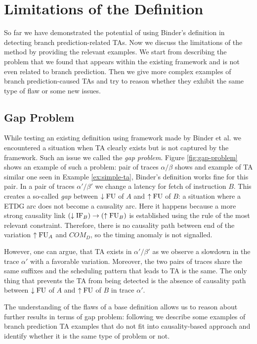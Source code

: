 \section{Limitations of the Definition}

So far we have demonstrated the potential of using Binder's definition in detecting branch prediction-related TAs. Now we discuss the limitations of the method by providing the relevant examples. We start from describing the problem that we found that appears within the existing framework and is not even related to branch prediction. Then we give more complex examples of branch prediction-caused TAs and try to reason whether they exhibit the same type of flaw or some new issues.

\subsection{Gap Problem}

While testing an existing definition using framework made by Binder et al. we encountered a situation when TA clearly exists but is not captured by the framework. Such an issue we called the \textit{gap problem}. Figure \ref{fig:gap-problem} shows an example of such a problem: pair of traces $\alpha/\beta$ shows and example of TA similar one seen in Example \ref{ex:simple-ta}, Binder's definition works fine for this pair. In a pair of traces $\alpha'/\beta'$ we change a latency for fetch of instruction $B$. This creates a so-called \textit{gap} between $\downarrow\mathrm{FU}$ of $A$ and $\uparrow\mathrm{FU}$ of $B$: a situation where a ETDG arc does not become a causality arc. Here it happens because a more strong causality link $(\downarrow\mathrm{IF}_B) \rightarrow (\uparrow\mathrm{FU}_B)$ is established using the rule of the most relevant constraint. Therefore, there is no causality path between end of the variation $\uparrow\mathrm{FU}_A$ and $COM_D$, so the timing anomaly is not signalled.

However, one can argue, that TA exists in $\alpha'/\beta'$ as we observe a slowdown in the trace $\alpha'$ with a favorable variation. Moreover, the two pairs of traces share the same suffixes and the scheduling pattern that leads to TA is the same. The only thing that prevents the TA from being detected is the absence of causality path between $\downarrow\mathrm{FU}$ of $A$ and $\uparrow\mathrm{FU}$ of $B$ in trace $\alpha'$.

The understanding of the flaws of a base definition allows us to reason about further results in terms of gap problem: following we describe some examples of branch prediction TA examples that do not fit into causality-based approach and identify whether it is the same type of problem or not.

